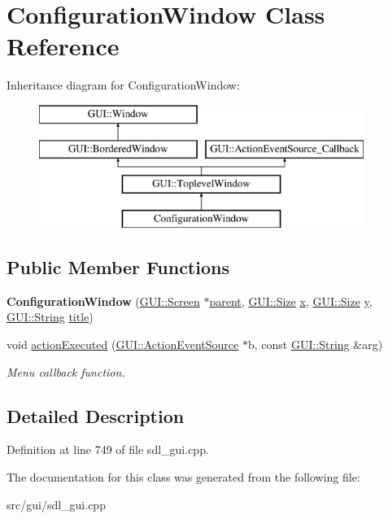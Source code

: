 \hypertarget{classConfigurationWindow}{\section{Configuration\-Window Class Reference}
\label{classConfigurationWindow}
}
Inheritance diagram for Configuration\-Window\-:\begin{figure}[H]
\begin{center}
\leavevmode
\includegraphics[height=4.000000cm]{classConfigurationWindow}
\end{center}
\end{figure}
\subsection*{Public Member Functions}
\begin{DoxyCompactItemize}
\item 
\hypertarget{classConfigurationWindow_aa024579e615b177a61410dc04b70d124}{{\bfseries Configuration\-Window} (\hyperlink{classGUI_1_1Screen}{G\-U\-I\-::\-Screen} $\ast$\hyperlink{classGUI_1_1Window_a2e593ff65e7702178d82fe9010a0b539}{parent}, \hyperlink{namespaceGUI_a10b6232e08729baa0bd211a86a69ce36}{G\-U\-I\-::\-Size} \hyperlink{classGUI_1_1Window_a6ca6a80ca00c9e1d8ceea8d3d99a657d}{x}, \hyperlink{namespaceGUI_a10b6232e08729baa0bd211a86a69ce36}{G\-U\-I\-::\-Size} \hyperlink{classGUI_1_1Window_a0ee8e923aff2c3661fc2e17656d37adf}{y}, \hyperlink{classGUI_1_1String}{G\-U\-I\-::\-String} \hyperlink{classGUI_1_1ToplevelWindow_a04de191f9a57b5b584657866a4ac6843}{title})}\label{classConfigurationWindow_aa024579e615b177a61410dc04b70d124}

\item 
\hypertarget{classConfigurationWindow_a2dac96be9ab39e51f0eabec372406664}{void \hyperlink{classConfigurationWindow_a2dac96be9ab39e51f0eabec372406664}{action\-Executed} (\hyperlink{classGUI_1_1ActionEventSource}{G\-U\-I\-::\-Action\-Event\-Source} $\ast$b, const \hyperlink{classGUI_1_1String}{G\-U\-I\-::\-String} \&arg)}\label{classConfigurationWindow_a2dac96be9ab39e51f0eabec372406664}

\begin{DoxyCompactList}\small\item\em Menu callback function. \end{DoxyCompactList}\end{DoxyCompactItemize}


\subsection{Detailed Description}


Definition at line 749 of file sdl\-\_\-gui.\-cpp.



The documentation for this class was generated from the following file\-:\begin{DoxyCompactItemize}
\item 
src/gui/sdl\-\_\-gui.\-cpp\end{DoxyCompactItemize}
